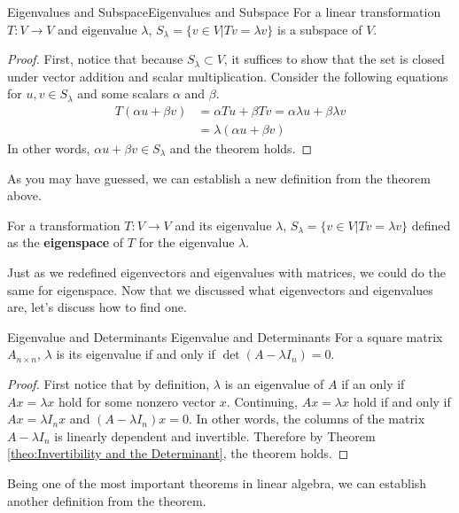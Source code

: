 \documentclass[../main.tex]{subfiles}
\begin{document}
\begin{theorem}{Eigenvalues and Subspace}{Eigenvalues and Subspace}
For a linear transformation $T: V \to V$ and eigenvalue $\lambda$,
$S_\lambda = \{ v \in V | Tv = \lambda v \}$ is a subspace of $V$.
\end{theorem}
\begin{proof}
First, notice that because $S_\lambda \subset V$, it suffices to
show that the set is closed under vector addition and scalar
multiplication. Consider the following equations for $u, v \in
S_\lambda$ and some scalars $\alpha$ and $\beta$.
\begin{align*}
    T(\alpha u + \beta v)
    &= \alpha Tu + \beta Tv
    = \alpha \lambda u + \beta \lambda v \\
    &= \lambda(\alpha u + \beta v)
\end{align*}
In other words, $\alpha u + \beta v \in S_\lambda$ and the theorem
holds.
\end{proof}

As you may have guessed, we can establish a new definition from
the theorem above.

\begin{definition}
For a transformation $T: V \to V$ and its eigenvalue $\lambda$,
$S_\lambda = \{ v \in V | Tv = \lambda v \}$ defined as the
\textbf{eigenspace} of $T$ for the eigenvalue $\lambda$.
\end{definition}

Just as we redefined eigenvectors and eigenvalues with matrices,
we could do the same for eigenspace. Now that we discussed what
eigenvectors and eigenvalues are, let's discuss how to find one.

\begin{theorem}{Eigenvalue and Determinants}
{Eigenvalue and Determinants}
For a square matrix $A_{n \times n}$, $\lambda$ is its eigenvalue
if and only if $\det(A - \lambda I_n) = 0$.
\end{theorem}
\begin{proof}
First notice that by definition, $\lambda$ is an eigenvalue of $A$
if an only if $Ax = \lambda x$ hold for some nonzero vector $x$.
Continuing, $Ax = \lambda x$ hold if and only if $Ax = \lambda I_n x$
and $(A - \lambda I_n)x = 0$. In other words, the columns of the
matrix $A - \lambda I_n$ is linearly dependent and invertible.
Therefore by Theorem \ref{theo:Invertibility and the Determinant},
the theorem holds.
\end{proof}

Being one of the most important theorems in linear algebra,
we can establish another definition from the theorem.
\end{document}
